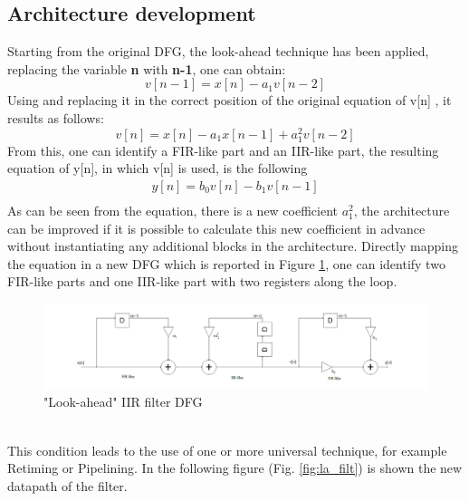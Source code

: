 \documentclass[a4paper, titlepage]{article}
\begin{document}
\subsection{Architecture development}
Starting from the original DFG, the look-ahead technique has been applied, replacing the variable \textbf{n} with \textbf{n-1}, one can obtain:
\begin{equation}
    v[n-1]=x[n]-a_{1}v[n-2]
\end{equation}
Using and replacing it in the correct position of the original equation of v[n] , it results as follows:
\begin{equation}
    v[n]=x[n]-a_{1}x[n-1]+a_{1}^2v[n-2]
\end{equation}
From this, one can identify a FIR-like part and an IIR-like part, %
the resulting equation of y[n], in which v[n] is used, is the following
\begin{gather}
    y[n]=b_{0}v[n]-b_{1}v[n-1] \\
\end{gather}
As can be seen from the equation, there is a new coefficient $a_{1}^2$, the architecture can be improved if it is possible to calculate this new coefficient in advance without instantiating any additional blocks in the architecture.
Directly mapping the equation in a new DFG which is reported in Figure \ref{fig:dfg_la_filt}, one can identify two FIR-like parts and one IIR-like part with two registers along the loop. 
 \begin{figure} [h]
\centering
	\includegraphics[scale=0.3]{DFG_filter_la.png}
	\caption{"Look-ahead" IIR filter DFG}
	\label{fig:dfg_la_filt}
\end{figure}   
\\
This condition leads to the use of one or more universal technique, for example Retiming or Pipelining. 
\newline In the following figure (Fig. \ref{fig:la_filt}) is shown the new datapath of the filter.
\end{document}
